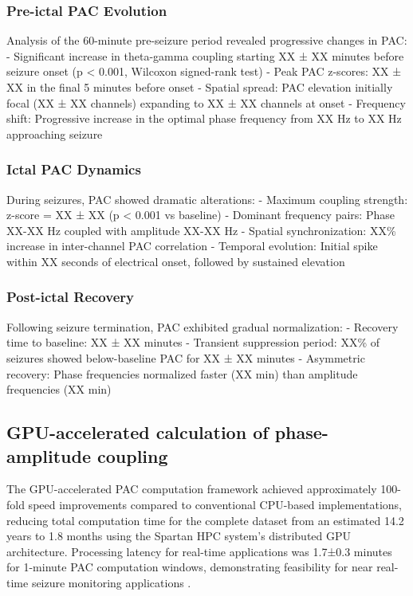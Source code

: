\subsubsection{Pre-ictal PAC Evolution}
Analysis of the 60-minute pre-seizure period revealed progressive changes in PAC:
- Significant increase in theta-gamma coupling starting XX ± XX minutes before seizure onset (p < 0.001, Wilcoxon signed-rank test)
- Peak PAC z-scores: XX ± XX in the final 5 minutes before onset
- Spatial spread: PAC elevation initially focal (XX ± XX channels) expanding to XX ± XX channels at onset
- Frequency shift: Progressive increase in the optimal phase frequency from XX Hz to XX Hz approaching seizure

\subsubsection{Ictal PAC Dynamics}
During seizures, PAC showed dramatic alterations:
- Maximum coupling strength: z-score = XX ± XX (p < 0.001 vs baseline)
- Dominant frequency pairs: Phase XX-XX Hz coupled with amplitude XX-XX Hz
- Spatial synchronization: XX\% increase in inter-channel PAC correlation
- Temporal evolution: Initial spike within XX seconds of electrical onset, followed by sustained elevation

\subsubsection{Post-ictal Recovery}
Following seizure termination, PAC exhibited gradual normalization:
- Recovery time to baseline: XX ± XX minutes
- Transient suppression period: XX\% of seizures showed below-baseline PAC for XX ± XX minutes
- Asymmetric recovery: Phase frequencies normalized faster (XX min) than amplitude frequencies (XX min)



\subsection{GPU-accelerated calculation of phase-amplitude coupling}
The GPU-accelerated PAC computation framework achieved approximately 100-fold speed improvements compared to conventional CPU-based implementations, reducing total computation time for the complete dataset from an estimated 14.2 years to 1.8 months using the Spartan HPC system's distributed GPU architecture. Processing latency for real-time applications was 1.7±0.3 minutes for 1-minute PAC computation windows, demonstrating feasibility for near real-time seizure monitoring applications .

